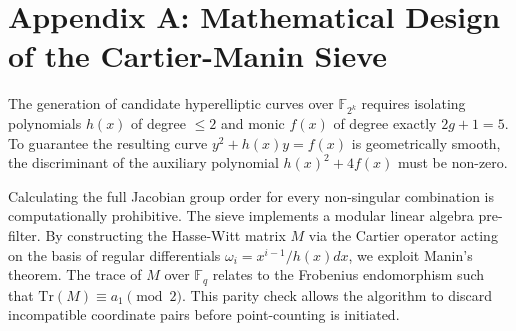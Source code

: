 \documentclass[12pt]{article}
\begin{document}
\section*{Appendix A: Mathematical Design of the Cartier-Manin Sieve}
The generation of candidate hyperelliptic curves over $\mathbb{F}_{2^k}$ requires isolating polynomials $h(x)$ of degree $\le 2$ and monic $f(x)$ of degree exactly $2g+1=5$. To guarantee the resulting curve $y^2 + h(x)y = f(x)$ is geometrically smooth, the discriminant of the auxiliary polynomial $h(x)^2 + 4f(x)$ must be non-zero. 

Calculating the full Jacobian group order for every non-singular combination is computationally prohibitive. The sieve implements a modular linear algebra pre-filter. By constructing the Hasse-Witt matrix $M$ via the Cartier operator acting on the basis of regular differentials $\omega_i = x^{i-1}/h(x) dx$, we exploit Manin's theorem. The trace of $M$ over $\mathbb{F}_q$ relates to the Frobenius endomorphism such that $\text{Tr}(M) \equiv a_1 \pmod 2$. This parity check allows the algorithm to discard incompatible coordinate pairs before point-counting is initiated. 
\end{document}
